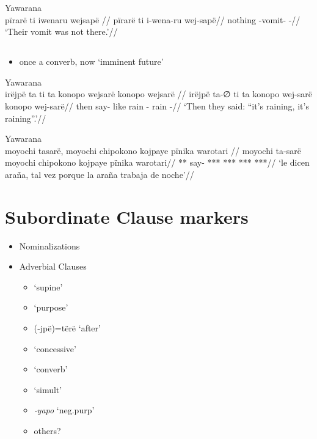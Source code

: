 \documentclass{memoir}
\begin{document}
\ex Yawarana \\
\label{ctorat-19}    \begingl
    \glpreamble  pïrarë ti iwenaru wejsapë //
    \gla pïrarë ti i-wena-ru wej-sapë//
    \glb nothing  -vomit- -//
        \glft ‘Their vomit was not there.’//  
    \endgl 
\xe

\subsection{\texorpdfstring{ \label{sec:sareimn}}{ }}

\begin{itemize}
\tightlist
\item
  once a converb, now `imminent future'
\end{itemize}

\ex Yawarana \\
\label{ctorat-25}    \begingl
    \glpreamble  irëjpë ta ti ta konopo wejsarë konopo wejsarë //
    \gla irëjpë ta-∅ ti ta konopo wej-sarë konopo wej-sarë//
    \glb then say-  like rain - rain -//
        \glft ‘Then they said: “it’s raining, it’s raining”.’//  
    \endgl 
\xe

\ex Yawarana \\
\label{ctoaragrme-25}    \begingl
    \glpreamble  moyochi tasarë, moyochi chipokono kojpaye pïnika warotari //
    \gla moyochi ta-sarë moyochi chipokono kojpaye pïnika warotari//
    \glb *** say- *** *** ***  ***//
        \glft ‘le dicen araña, tal vez porque la araña trabaja de noche’//  
    \endgl 
\xe

\section{Subordinate Clause markers}

\begin{itemize}
\tightlist
\item
  Nominalizations
\item
  Adverbial Clauses

  \begin{itemize}
  \tightlist
  \item
     `supine'
  \item
     `purpose'
  \item
    (‑jpë)=tërë `after'
  \item
     `concessive'
  \item
     `converb'
  \item
     `simult'
  \item
    \emph{‑yapo} `neg.purp'
  \item
    others?
  \end{itemize}
\end{itemize}
\end{document}
